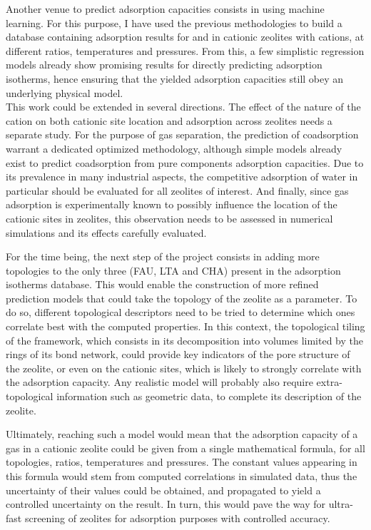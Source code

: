 Another venue to predict adsorption capacities consists in using machine learning. For this purpose, I have used the previous methodologies to build a database containing adsorption results for  and  in cationic zeolites with  cations, at different \SiAl ratios, temperatures and pressures. From this, a few simplistic regression models already show promising results for directly predicting adsorption isotherms, hence ensuring that the yielded adsorption capacities still obey an underlying physical model.\\

This work could be extended in several directions. The effect of the nature of the cation on both cationic site location and adsorption across zeolites needs a separate study. For the purpose of gas separation, the prediction of coadsorption warrant a dedicated optimized methodology, although simple models already exist to predict coadsorption from pure components adsorption capacities. Due to its prevalence in many industrial aspects, the competitive adsorption of water in particular should be evaluated for all zeolites of interest. And finally, since gas adsorption is experimentally known to possibly influence the location of the cationic sites in zeolites, this observation needs to be assessed in numerical simulations and its effects carefully evaluated.

For the time being, the next step of the project consists in adding more topologies to the only three (FAU, LTA and CHA) present in the adsorption isotherms database. This would enable the construction of more refined prediction models that could take the topology of the zeolite as a parameter. To do so, different topological descriptors need to be tried to determine which ones correlate best with the computed properties. In this context, the topological tiling of the framework, which consists in its decomposition into volumes limited by the rings of its bond network, could provide key indicators of the pore structure of the zeolite, or even on the cationic sites, which is likely to strongly correlate with the adsorption capacity. Any realistic model will probably also require extra-topological information such as geometric data, to complete its description of the zeolite.

Ultimately, reaching such a model would mean that the adsorption capacity of a gas in a cationic zeolite could be given from a single mathematical formula, for all topologies, \SiAl ratios, temperatures and pressures. The constant values appearing in this formula would stem from computed correlations in simulated data, thus the uncertainty of their values could be obtained, and propagated to yield a controlled uncertainty on the result. In turn, this would pave the way for ultra-fast screening of zeolites for adsorption purposes with controlled accuracy.
